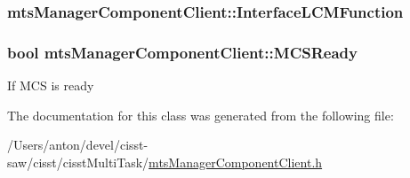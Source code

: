 \subsubsection[{Interface\+L\+C\+M\+Function}]{ mts\+Manager\+Component\+Client\+::\+Interface\+L\+C\+M\+Function\hspace{0.3cm}{\ttfamily [protected]}}\label{classmts_manager_component_client_a5ce720ccbed957a6b910e5f2dc27753a}
\hypertarget{classmts_manager_component_client_abb3a505ba4d4fc2ac5f53c4ba4046b8e}{}
\subsubsection[{M\+C\+S\+Ready}]{\setlength{\rightskip}{0pt plus 5cm}bool mts\+Manager\+Component\+Client\+::\+M\+C\+S\+Ready\hspace{0.3cm}{\ttfamily [protected]}}\label{classmts_manager_component_client_abb3a505ba4d4fc2ac5f53c4ba4046b8e}
If M\+C\+S is ready 

The documentation for this class was generated from the following file\+:\begin{DoxyCompactItemize}
\item 
/\+Users/anton/devel/cisst-\/saw/cisst/cisst\+Multi\+Task/\hyperlink{mts_manager_component_client_8h}{mts\+Manager\+Component\+Client.\+h}\end{DoxyCompactItemize}
